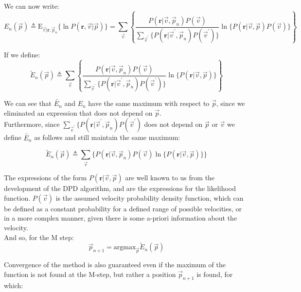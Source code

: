 \documentclass[10pt,a4paper]{report}
\begin{document}
We can now write:
\begin{equation}
E_n(\vec{p}) \triangleq \text{E}_{\vec{v}|\mathbf{r},\vec{p}_n} \{ \ln P(\mathbf{r},\vec{v}|\vec{p})\}=
\sum_{\vec{v}}\left\{
\frac{P(\mathbf{r}|\vec{v},\vec{p}_n)P(\vec{v})} { \sum_{\vec{v}^{'}} \{ 
P(\mathbf{r}|\vec{v}^{'},\vec{p}_n)P(\vec{v}^{'})
\} }
\ln \{P(\mathbf{r}|\vec{v},\vec{p})P(\vec{v}) \} 
\right\}
\end{equation}


If we define:
\begin{equation}
\tilde{E}_n(\vec{p}) \triangleq
\sum_{\vec{v}}
\left\{
\frac
{
P(\mathbf{r}|\vec{v},\vec{p}_n)P(\vec{v})} 
{ 
\sum_{\vec{v}^{'}} \{ 
P(\mathbf{r}|\vec{v}^{'},\vec{p}_n)P(\vec{v}^{'})
\} 
}
\ln \{P(\mathbf{r}|\vec{v},\vec{p})\} 
\right\}
\end{equation}

We can see that $\tilde{E_n}$ and $E_n$ have the same maximum with respect to $\vec{p}$, since we eliminated an expression that does not depend on $\vec{p}$.\\

Furthermore, since $\sum_{\vec{v}^{'}} \{P(\mathbf{r}|\vec{v}^{'},\vec{p}_n)P(\vec{v}^{'})$ does not depend on $\vec{p}$ or $\vec{v}$ we define $\tilde{E_n}$ as follows and still maintain the same maximum:

\begin{equation}
\label{eq:e_n_tilde_discrete}
\tilde{E}_n(\vec{p}) \triangleq
\sum_{\vec{v}}
\{
P(\mathbf{r}|\vec{v},\vec{p}_n)P(\vec{v}) 
\ln \{P(\mathbf{r}|\vec{v},\vec{p})\} 
\}
\end{equation}


The expressions of the form $P(\mathbf{r}|\vec{v},\vec{p})$ are well known to us from the development of the DPD algorithm, and are the expressions for the likelihood function. $P(\vec{v})$ is the assumed velocity probability density function, which can be defined as a constant probability for a defined range of possible velocities, or in a more complex manner, given there is some a-priori information about the velocity.\\

And so, for the M step:
\begin{equation}
\vec{p}_{n+1} = \text{argmax}_{\vec{p}}\tilde{E}_n(\vec{p})
\end{equation}

Convergence of the method is also guaranteed even if the maximum of the function is not found at the M-step, but rather a position $\vec{p}_{n+1}$ is found, for which:
\end{document}
